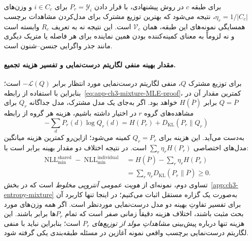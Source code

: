 برای طبقه $c$ در روش پیشنهادی، با قرار دادن $P_r=\mathscr Y_i$ برای $i\in C_c$ و وزن‌های $\eta_r=1/|C_c|$، نتیجه می‌شود که بهترین توزیع مشترک برای مدل‌کردن مشاهدات برچسب همسایگی نمونه‌های این طبقه، همان $\mathcal V_c$ است. این نتیجه نه به تعریف $R_c$ وابسته است و نه لزوماً به معنای کمینه‌کننده بودن همین نماینده برای هر فاصله یا متریک دیگری مانند جذر واگرایی جنسن--شنون است.

\paragraph{مقدار بهینه منفی لگاریتم درست‌نمایی و تفسیر هزینه تجمیع.}
برای توزیع مشترک $Q$، منفی لگاریتم درست‌نمایی مورد انتظار برابر $-\mathcal L(Q)$ است؛ بنابراین با استفاده از رابطه~\eqref{eq:app-ch3-mixture-MLE-proof}، کمترین مقدار آن در $Q=\overline P$ برابر $H(\overline P)$ خواهد بود. اگر به‌جای یک مدل مشترک، مدل جداگانه $Q_r$ برای مشاهده‌های گروه $r$ در اختیار داشته باشیم، هزینه هر گروه از رابطه
\[
-\sum_d P_r(d)\log Q_r(d)
=H(P_r)+D_{\mathrm{KL}}(P_r\|Q_r)
\]
به‌دست می‌آید. این هزینه برای $Q_r=P_r$ کمینه می‌شود؛ ازاین‌رو کمترین هزینه میانگین مدل‌های اختصاصی $\sum_r\eta_rH(P_r)$ است. در نتیجه اختلاف دو مقدار بهینه برابر است با:
\begin{equation}\label{eq:app-ch3-NLL-compression-gap}
\begin{aligned}
\operatorname{NLL}_{\min}^{\mathrm{shared}}
-\operatorname{NLL}_{\min}^{\mathrm{individual}}
&=H(\overline P)-\sum_r\eta_rH(P_r)\\
&=\sum_r\eta_rD_{\mathrm{KL}}(P_r\|\overline P)
\ge0.
\end{aligned}
\end{equation}
تساوی دوم، نمونه‌ای از \emph{هویت عمومی آنتروپی مخلوط}
است که در بخش~\ref{app:ch3-entropy-mixture} به‌صورت
یک گزاره مستقل اثبات می‌کنیم؛ در اینجا تنها
کاربرد آن برای تفسیر تفاوتِ بهینه دو مدل
درست‌نمایی موردنظر است. اگر همه وزن‌های مورد بحث
مثبت باشند، اختلاف هزینه دقیقاً زمانی صفر است
که تمام $P_r$ها برابر باشند. این هزینه تنها
درباره پیش‌بینی \emph{مشاهداتِ مولد از توزیع‌های $P_r$}
است؛ بنابراین نباید با منفی لگاریتم درست‌نمایی
برچسب واقعی نمونه آغازین در مسئله طبقه‌بندی
یکی گرفته شود.

